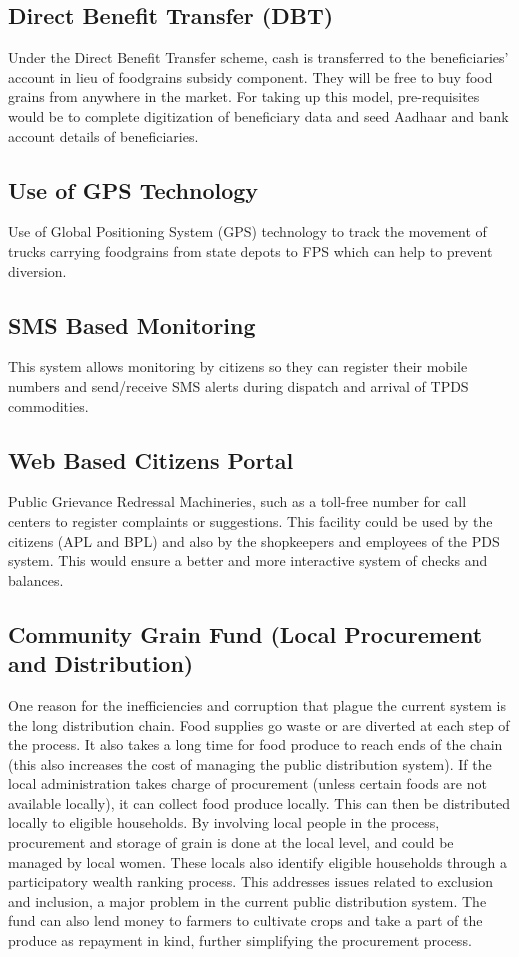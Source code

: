 \documentclass{article}
\begin{document}
\subsection{Direct Benefit Transfer (DBT)}
Under the Direct Benefit Transfer scheme, cash is transferred to the beneficiaries’ account in lieu of foodgrains subsidy component. They will be free to buy food grains from anywhere in the market. For taking up this model, pre-requisites would be to complete digitization of beneficiary data and seed Aadhaar and bank account details of beneficiaries.

\subsection{Use of GPS Technology}
Use of Global Positioning System (GPS) technology to track the movement of trucks carrying foodgrains from state depots to FPS which can help to prevent diversion.

\subsection{SMS Based Monitoring}
This system allows monitoring by citizens so they can register their mobile numbers and send/receive SMS alerts during dispatch and arrival of TPDS commodities. 

\subsection{Web Based Citizens Portal}
Public Grievance Redressal Machineries, such as a toll-free number for call centers to register complaints or suggestions. This facility could be used by the citizens (APL and BPL) and also by the shopkeepers and employees of the PDS system. This would ensure a better and more interactive system of checks and balances.

\subsection{Community Grain Fund (Local Procurement and Distribution)}
One reason for the inefficiencies and corruption that plague the current system is the long distribution chain. Food supplies go waste or are diverted at each step of the process. It also takes a long time for food produce to reach ends of the chain (this also increases the cost of managing the public distribution system). If the local administration takes charge of procurement (unless certain foods are not available locally), it can collect food produce locally. This can then be distributed locally to eligible households. By involving local people in the process, procurement and storage of grain is done at the local level, and could be managed by local women. These locals also identify eligible households through a participatory wealth ranking process. This addresses issues related to exclusion and inclusion, a major problem in the current public distribution system. The fund can also lend money to farmers to cultivate crops and take a part of the produce as repayment in kind, further simplifying the procurement process.
\end{document}
